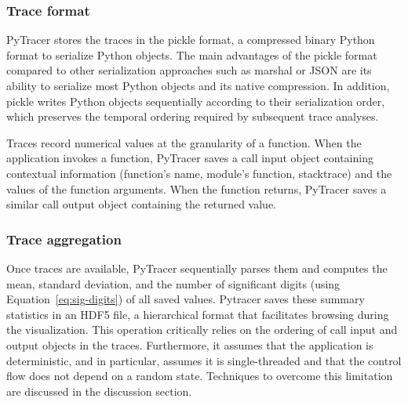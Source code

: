 \documentclass[11pt]{article}
\newcommand{\pytracer}[0]{PyTracer\xspace}
\begin{document}

\subsubsection{Trace format}

\pytracer stores the traces in the pickle format, a compressed binary Python format to serialize Python objects.
The main advantages of the pickle format compared to other serialization approaches such as marshal or JSON are its ability to serialize most Python objects and its native compression.  In addition, pickle writes Python objects sequentially according to their serialization order, which preserves the temporal ordering required by subsequent trace analyses.

Traces record numerical values at the granularity of a function. When the application invokes a function, \pytracer saves a call input object containing contextual information (function's name, module's function, stacktrace) and the values of the function arguments. When the function returns, \pytracer saves a similar call output object containing the returned value. 


\subsubsection{Trace aggregation}

Once traces are available, \pytracer sequentially parses them and computes the mean, standard deviation, and the number of significant digits (using Equation~\ref{eq:sig-digits}) of all saved values. Pytracer saves these summary statistics in an HDF5 file, a hierarchical format that facilitates browsing during the visualization. This operation critically relies on the ordering of call input and output objects in the traces. Furthermore, it assumes that the application is deterministic, and in particular, assumes it is single-threaded and that the control flow does not depend on a random state. Techniques to overcome this limitation are discussed in the discussion section.
\end{document}

